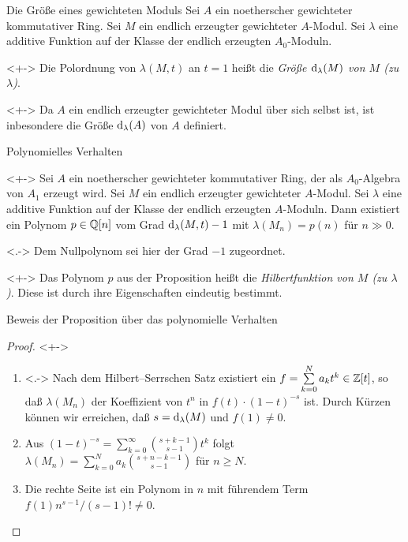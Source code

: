 \begin{frame}{Die Größe eines gewichteten Moduls}
	Sei \(A\) ein noetherscher gewichteter kommutativer Ring.
	Sei \(M\) ein endlich erzeugter gewichteter \(A\)-Modul. Sei
	\(\lambda\) eine additive Funktion auf der Klasse der endlich erzeugten
	\(A_0\)-Moduln.
	\begin{definition}<+->
		Die Polordnung von \(\lambda(M, t)\) an \(t = 1\) heißt die \emph{Größe \(\operatorname{d}_\lambda(M)\)
		von \(M\) (zu \(\lambda\))}.
	\end{definition}
	\begin{example}<+->
		Da \(A\) ein endlich erzeugter gewichteter Modul über sich selbst ist, ist inbesondere
		die Größe \(\operatorname{d}_\lambda(A)\) von \(A\) definiert.
	\end{example}
\end{frame}

\begin{frame}{Polynomielles Verhalten}
	\begin{proposition}<+->
		Sei \(A\) ein noetherscher gewichteter kommutativer Ring, der als \(A_0\)-Algebra von \(A_1\) erzeugt wird.
		Sei \(M\) ein endlich erzeugter gewichteter \(A\)-Modul.
		Sei \(\lambda\) eine additive Funktion auf der Klasse der endlich erzeugten \(A\)-Moduln.
		Dann existiert ein Polynom \(p \in \mathbb Q[n]\) vom Grad \(\operatorname{d}_\lambda(M, t) - 1\) mit \(\lambda(M_n) = p(n)\)
		für \(n \gg 0\).
	\end{proposition}
	\begin{visibleenv}<.->
		Dem Nullpolynom sei hier der Grad \(-1\) zugeordnet.
	\end{visibleenv}
	\begin{visibleenv}<+->
		Das Polynom \(p\) aus der Proposition heißt die
		\emph{Hilbertfunktion von \(M\) (zu \(\lambda\))}. Diese ist durch
		ihre Eigenschaften eindeutig bestimmt.
	\end{visibleenv}
\end{frame}

\begin{frame}{Beweis der Proposition über das polynomielle Verhalten}
	\begin{proof}<+->
		\begin{enumerate}[<+->]
		\item<.->
			Nach dem Hilbert--Serrschen Satz existiert ein
			\(f = \sum\limits_{k = 0}^N a_k t^k \in \mathbb Z[t]\), so daß \(\lambda(M_n)\)
			der Koeffizient von \(t^n\) in \(f(t) \cdot (1 - t)^{-s}\) ist. Durch
			Kürzen können wir erreichen, daß
			\(s = \operatorname{d}_\lambda(M)\) und \(f(1) \neq 0\).
		\item
			Aus \((1 - t)^{-s} = \sum\limits_{k = 0}^\infty \binom{s + k - 1}{s - 1} t^k\) folgt
			\(\lambda(M_n) = \sum\limits_{k = 0}^N a_k \binom{s + n - k - 1}{s - 1}\) für \(n \ge N\).
		\item
			Die rechte Seite ist ein Polynom in \(n\) mit führendem Term
			\(f(1) n^{s - 1}/(s - 1)! \neq 0\).
			\qedhere
		\end{enumerate}
	\end{proof}
\end{frame}

